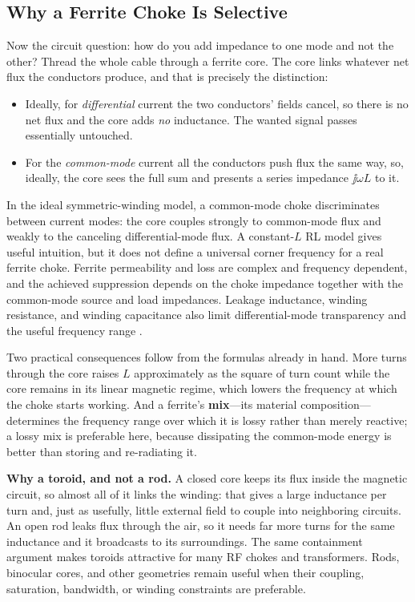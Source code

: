 \subsection{Why a Ferrite Choke Is Selective}
Now the circuit question: how do you add impedance to one mode and not the other?
Thread the whole cable through a ferrite core. The core links whatever net flux the
conductors produce, and that is precisely the distinction:
\begin{itemize}
\item Ideally, for \emph{differential} current the two conductors' fields cancel,
so there is no net flux and the core adds \emph{no} inductance. The wanted signal
passes essentially untouched.
\item For the \emph{common-mode} current all the conductors push flux the same way,
so, ideally, the core sees the full sum and presents a series impedance
\(\jj\omega L\) to it.
\end{itemize}
In the ideal symmetric-winding model, a common-mode choke discriminates between
current modes: the core couples strongly to common-mode flux and weakly to the
canceling differential-mode flux. A constant-\(L\) RL model gives useful intuition,
but it does not define a universal corner frequency for a real ferrite choke.
Ferrite permeability and loss are complex and frequency dependent, and the achieved
suppression depends on the choke impedance together with the common-mode source and
load impedances. Leakage inductance, winding resistance, and winding capacitance also
limit differential-mode transparency and the useful frequency range
\cite[pp.~132--143]{davis2011rfcircuit}.

Two practical consequences follow from the formulas already in hand. More turns
through the core raises \(L\) approximately as the square of turn count while the
core remains in its linear magnetic regime, which lowers the frequency at which the choke
starts working. And a ferrite's \textbf{mix}---its material composition---determines
the frequency range over which it is lossy rather than merely reactive; a lossy mix
is preferable here, because dissipating the common-mode energy is better than
storing and re-radiating it.

\begin{physicalbox}
\textbf{Why a toroid, and not a rod.} A closed core keeps its flux inside the
magnetic circuit, so almost all of it links the winding: that gives a large
inductance per turn and, just as usefully, little external field to couple into
neighboring circuits. An open rod leaks flux through the air, so it needs far more
turns for the same inductance and it broadcasts to its surroundings. The same
containment argument makes toroids attractive for many RF chokes and transformers.
Rods, binocular cores, and other geometries remain useful when their coupling,
saturation, bandwidth, or winding constraints are preferable.
\end{physicalbox}

